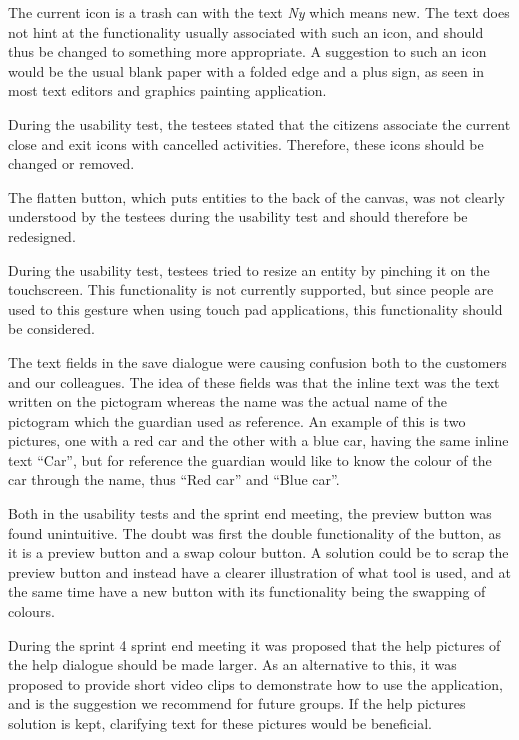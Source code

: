 \begin{description}[style=nextline]
\item[New icon for clearing the canvas]
The current icon is a trash can with the text \textit{Ny} which means new. 
The text does not hint at the functionality usually associated with such an icon, and should thus be changed to something more appropriate.
A suggestion to such an icon would be the usual blank paper with a folded edge and a plus sign, as seen in most text editors and graphics painting application. 

\item[Close and exit icons]
During the usability test, the testees stated that the citizens associate the current close and exit icons with cancelled activities.
Therefore, these icons should be changed or removed.

\item[Flatten button icon]
The flatten button, which puts entities to the back of the canvas, was not clearly understood by the testees during the usability test and should therefore be redesigned.

\item[Pinching]
During the usability test, testees tried to resize an entity by pinching it on the touchscreen. 
This functionality is not currently supported, but since people are used to this gesture when using touch pad applications, this functionality should be considered.

\item[Names in save dialogue]
The text fields in the save dialogue were causing confusion both to the customers and our colleagues.
The idea of these fields was that the inline text was the text written on the pictogram whereas the name was the actual name of the pictogram which the guardian used as reference.
An example of this is two pictures, one with a red car and the other with a blue car, having the same inline text ``Car'', but for reference the guardian would like to know the colour of the car through the name, thus ``Red car'' and ``Blue car''.

\item[Rethink preview button]
Both in the usability tests and the sprint end meeting, the preview button was found unintuitive.
The doubt was first the double functionality of the button, as it is a preview button and a swap colour button.
A solution could be to scrap the preview button and instead have a clearer illustration of what tool is used, and at the same time have a new button with its functionality being the swapping of colours.

\item[Alternative help dialogue]
During the sprint 4 sprint end meeting it was proposed that the help pictures of the help dialogue should be made larger.
As an alternative to this, it was proposed to provide short video clips to demonstrate how to use the application, and is the suggestion we recommend for future groups.
If the help pictures solution is kept, clarifying text for these pictures would be beneficial.


\end{description}
